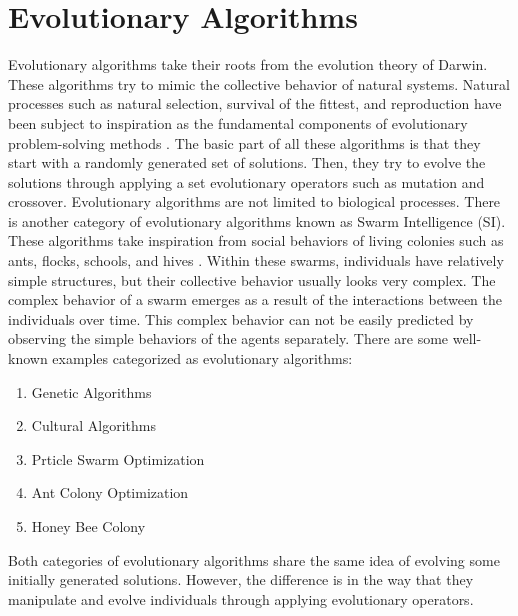 \section{Evolutionary Algorithms}
Evolutionary algorithms take their roots from the evolution theory of Darwin. These algorithms try to mimic the collective behavior of natural systems. Natural processes such as natural selection, survival of the fittest, and reproduction have been subject to inspiration as the fundamental components of evolutionary problem-solving methods \cite{burke2005search}. The basic part of all these algorithms is that they start with a randomly generated set of solutions. Then, they try to evolve the solutions through applying a set evolutionary operators such as mutation and crossover. \newline
Evolutionary algorithms are not limited to biological processes. There is another category of evolutionary algorithms known as Swarm Intelligence (SI). These algorithms take inspiration from social behaviors of living colonies such as ants, flocks, schools, and hives \cite{kennedy2001swarm}. Within these swarms, individuals have relatively simple structures, but their collective behavior usually looks very complex. The complex behavior of a swarm emerges as a result of the interactions between the individuals over time. This complex behavior can not be easily predicted by observing the simple behaviors of the agents separately. \newline
There are some well-known examples categorized as evolutionary algorithms:
\begin{enumerate}
	\item Genetic Algorithms
	\item Cultural Algorithms
	\item Prticle Swarm Optimization
	\item Ant Colony Optimization
	\item Honey Bee Colony
\end{enumerate}
Both categories of evolutionary algorithms share the same idea of evolving some initially generated solutions. However, the difference is in the way that they manipulate and evolve individuals through applying evolutionary operators. 
